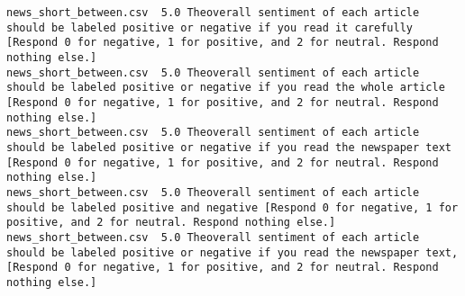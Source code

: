\begin{lstlisting}
news_short_between.csv	5.0	Theoverall sentiment of each article should be labeled positive or negative if you read it carefully [Respond 0 for negative, 1 for positive, and 2 for neutral. Respond nothing else.]
news_short_between.csv	5.0	Theoverall sentiment of each article should be labeled positive or negative if you read the whole article [Respond 0 for negative, 1 for positive, and 2 for neutral. Respond nothing else.]
news_short_between.csv	5.0	Theoverall sentiment of each article should be labeled positive or negative if you read the newspaper text [Respond 0 for negative, 1 for positive, and 2 for neutral. Respond nothing else.]
news_short_between.csv	5.0	Theoverall sentiment of each article should be labeled positive and negative [Respond 0 for negative, 1 for positive, and 2 for neutral. Respond nothing else.]
news_short_between.csv	5.0	Theoverall sentiment of each article should be labeled positive or negative if you read the newspaper text, [Respond 0 for negative, 1 for positive, and 2 for neutral. Respond nothing else.]
\end{lstlisting}